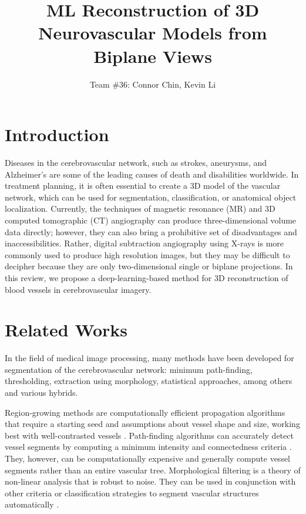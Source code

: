 \documentclass[letterpaper, 10 pt, journal]{ieeeconf}
\title{\LARGE \bf ML Reconstruction of 3D Neurovascular Models from Biplane Views}
\author{Team \#36: Connor Chin, Kevin Li}
\begin{document}
\maketitle
\thispagestyle{empty}
\pagestyle{empty}

\section{Introduction}

Diseases in the cerebrovascular network, such as strokes, aneurysms, and Alzheimer’s are some of the leading causes of death and disabilities worldwide.
In treatment planning, it is often essential to create a 3D model of the vascular network, which can be used for segmentation, classification, or anatomical object localization.
Currently, the techniques of magnetic resonance (MR) and 3D computed tomographic (CT) angiography can produce three-dimensional volume data directly;
however, they can also bring a prohibitive set of disadvantages and inaccessibilities.
Rather, digital subtraction angiography using X-rays is more commonly used to produce high resolution images, but they may be difficult to decipher because they are only two-dimensional single or biplane projections.
In this review, we propose a deep-learning-based method for 3D reconstruction of blood vessels in cerebrovascular imagery.


\section{Related Works}

In the field of medical image processing, many methods have been developed for segmentation of the cerebrovascular network: minimum path-finding, thresholding, extraction using morphology, statistical approaches, among others and various hybrids.

Region-growing methods are computationally efficient propagation algorithms that require a starting seed and assumptions about vessel shape and size, working best with well-contrasted vessels \cite{region_growing}.
Path-finding algorithms can accurately detect vessel segments by computing a minimum intensity and connectedness criteria \cite{path_finding}.
They, however, can be computationally expensive and generally compute vessel segments rather than an entire vascular tree.
Morphological filtering is a theory of non-linear analysis that is robust to noise.
They can be used in conjunction with other criteria or classification strategies to segment vascular structures automatically \cite{morphology}.
\end{document}
